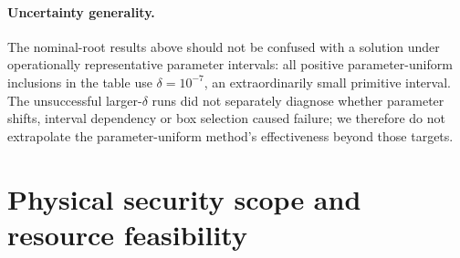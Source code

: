\documentclass[11pt,a4paper]{article}
\theoremstyle{remark}\newtheorem{remark}[theorem]{Remark}
\begin{document}
\paragraph{Uncertainty generality.} The nominal-root results above should not be confused with a solution under operationally representative parameter intervals: all positive parameter-uniform inclusions in the table use $\delta=10^{-7}$, an extraordinarily small primitive interval. The unsuccessful larger-$\delta$ runs did not separately diagnose whether parameter shifts, interval dependency or box selection caused failure; we therefore do not extrapolate the parameter-uniform method's effectiveness beyond those targets.

\section{Physical security scope and resource feasibility}\label{sec:security}
\end{document}
